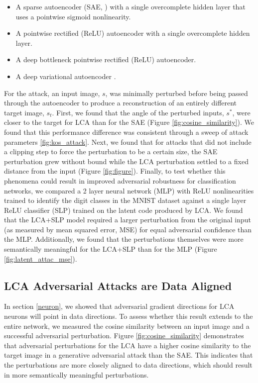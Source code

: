 \begin{itemize}
  \item A sparse autoencoder (SAE, \parencite{ng2011sparse}) with a single overcomplete hidden layer that uses a pointwise sigmoid nonlinearity.
  \item A pointwise rectified (ReLU) autoencoder \parencite{citation} with a single overcomplete hidden layer.
  \item A deep bottleneck pointwise rectified (ReLU) autoencoder.
  \item A deep variational autoencoder \parencite{kingma2013auto}.
\end{itemize}

  For the attack, an input image, $s$, was minimally perturbed before being passed through the autoencoder to produce a reconstruction of an entirely different target image, $s_{t}$. First, we found that the angle of the perturbed inputs, $s^{*}$, were closer to the target for LCA than for the SAE (Figure \ref{fig:cosine_similarity}). We found that this performance difference was consistent through a sweep of attack parameters \ref{fig:kos_attack}. Next, we found that for attacks that did not include a clipping step to force the perturbation to be a certain size, the SAE perturbation grew without bound while the LCA perturbation settled to a fixed distance from the input (Figure \ref{fig:figure}). Finally, to test whether this phenomena could result in improved adversarial robustness for classification networks, we compared a 2 layer neural network (MLP) with ReLU nonlinearities trained to identify the digit classes in the MNIST dataset against a single layer ReLU classifier (SLP) trained on the latent code produced by LCA. We found that the LCA+SLP model required a larger perturbation from the original input (as measured by mean squared error, MSE) for equal adversarial confidence than the MLP. Additionally, we found that the perturbations themselves were more semantically meaningful for the LCA+SLP than for the MLP (Figure \ref{fig:latent_attac_mse}).


\subsection{LCA Adversarial Attacks are Data Aligned}
In section \ref{neuron}, we showed that adversarial gradient directions for LCA neurons will point in data directions. To assess whether this result extends to the entire network, we measured the cosine similarity between an input image and a successful adversarial perturbation. Figure \ref{fig:cosine_similarity} demonstrates that adversarial perturbations for the LCA have a higher cosine similarity to the target image in a generative adversarial attack \parencite{kos2018adversarial} than the SAE. This indicates that the perturbations are more closely aligned to data directions, which should result in more semantically meaningful perturbations.

